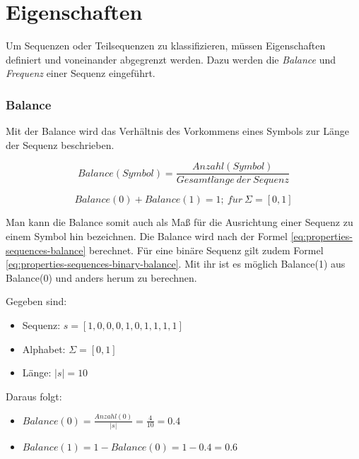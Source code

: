\section{Eigenschaften}
\label{chp:properties-sequences}
Um Sequenzen oder Teilsequenzen zu klassifizieren, müssen Eigenschaften definiert und voneinander abgegrenzt werden. Dazu werden die \textit{Balance} und \textit{Frequenz} einer Sequenz eingeführt.

\subsubsection{Balance}
\label{subsection:balance}

Mit der Balance wird das Verhältnis des Vorkommens eines Symbols zur Länge der Sequenz beschrieben. 

\begin{equation}
\label{eq:properties-sequences-balance}
Balance(Symbol) = \frac{Anzahl(Symbol)}{Gesamtl\ddot{a}nge\ der\ Sequenz}
\end{equation}

\begin{equation}
\label{eq:properties-sequences-binary-balance}
Balance(0) + Balance(1) = 1;\ f\ddot{u}r\ \Sigma = [0,1]
\end{equation}

Man kann die Balance somit auch als Maß für die Ausrichtung einer Sequenz zu einem Symbol hin bezeichnen. Die Balance wird nach der Formel \ref{eq:properties-sequences-balance} berechnet. Für eine binäre Sequenz gilt zudem Formel \ref{eq:properties-sequences-binary-balance}. Mit ihr ist es möglich Balance(1) aus Balance(0) und anders herum zu berechnen.

\begin{theorem}
Gegeben sind:
\begin{itemize}[noitemsep]
	\item Sequenz: $s = [1,0,0,0,1,0,1,1,1,1]$
	\item Alphabet: $\Sigma = [0,1]$
	\item Länge: $|s| = 10$
\end{itemize}
Daraus folgt:
\begin{itemize}
	\item [] $Balance(0) = \frac{Anzahl(0)}{|s|} = \frac{4}{10} = 0.4$
	\item [] $Balance(1) = 1 - Balance(0) = 1 - 0.4 = 0.6$
\end{itemize}
\end{theorem}

